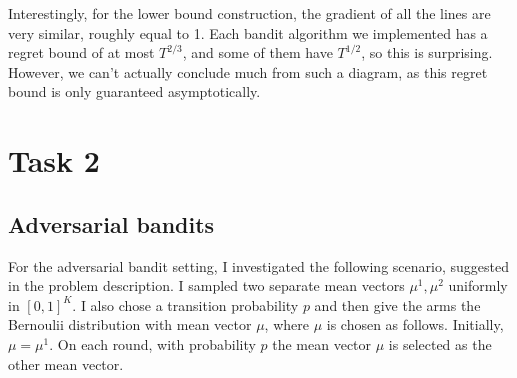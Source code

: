 \documentclass[10pt]{article}
\begin{document}
Interestingly, for the lower bound construction, the gradient of all the lines
are very similar, roughly equal to 1. Each bandit algorithm we implemented has a
regret bound of at most $T^{2/3}$, and some of them have $T^{1/2}$, so this is
surprising. However, we can't actually conclude much from such a diagram, as
this regret bound is only guaranteed asymptotically.

%

\section{Task 2}

\subsection{Adversarial bandits}

For the adversarial bandit setting, I investigated the following scenario,
suggested in the problem description. I sampled two separate mean vectors
$\mu^1, \mu^2$ uniformly in $[0,1]^K$. I also chose a transition probability $p$
and then give the arms the Bernoulii distribution with mean vector $\mu$, where
$\mu$ is chosen as follows.  Initially, $\mu = \mu^1$. On each round, with
probability $p$ the mean vector $\mu$ is selected as the other mean vector.
\end{document}
